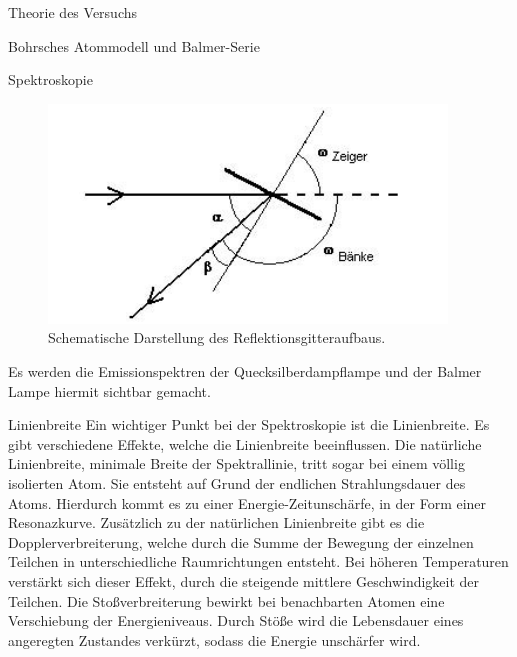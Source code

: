 \documentclass[pdftex, a4paper,11pt, twoside, ngerman]{report}
\begin{document}
\begin{chapter}{Theorie des Versuchs}
\begin{section}{Bohrsches Atommodell und Balmer-Serie}
\begin{subsection}{Spektroskopie}
        \begin{figure}[htbp]
          \begin{center}
            \includegraphics[width=.8\textwidth]{Figures/Gitteraufbau.png}
            \caption{Schematische Darstellung des Reflektionsgitteraufbaus.
                \cite{bib:LDDidactic}}
            \label{fig:Gitteraufbau}
          \end{center}
        \end{figure}
       
        Es werden die Emissionspektren der Quecksilberdampflampe und der Balmer
        Lampe hiermit sichtbar gemacht.
     
      \end{subsection}
     
     
     
      \begin{subsection}{Linienbreite}
        \label{chp:TheorieBohrBalmerSerieLinienbreite}
        Ein wichtiger Punkt bei der Spektroskopie ist die Linienbreite. Es gibt
        verschiedene Effekte, welche die Linienbreite beeinflussen. Die
        natürliche Linienbreite, minimale Breite der Spektrallinie, tritt
        sogar bei einem völlig isolierten Atom. Sie entsteht auf Grund der
        endlichen Strahlungsdauer des Atoms. Hierdurch kommt es zu einer
        Energie-Zeitunschärfe, in der Form einer Resonazkurve. Zusätzlich zu
        der natürlichen Linienbreite gibt es die Dopplerverbreiterung, welche
        durch die Summe  der Bewegung der einzelnen Teilchen in
        unterschiedliche Raumrichtungen entsteht. Bei höheren Temperaturen
        verstärkt sich dieser Effekt, durch die steigende mittlere
        Geschwindigkeit der Teilchen. Die Stoßverbreiterung bewirkt bei
        benachbarten Atomen eine Verschiebung der Energieniveaus. Durch Stöße
        wird die Lebensdauer eines angeregten Zustandes verkürzt, sodass die
        Energie unschärfer wird.
       
       
      \end{subsection}
     
    \end{section}

  \end{chapter}
\end{document}
